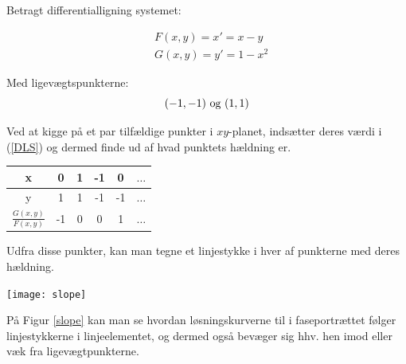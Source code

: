 \begin{Example}
\hfill \break
\textnormal{Betragt differentialligning systemet:} 

\begin{equation}\label{DLS}
    \begin{aligned}
    &F(x,y)= x'=x-y\\ 
    &G(x,y)=y'=1-x^2
    \end{aligned}
\end{equation}

\textnormal{Med ligevægtspunkterne:} $$(-1,-1) \ \textnormal{og} \ (1,1)$$
\textnormal{}

\textnormal{Ved at kigge på et par tilfældige punkter i $xy$-planet, indsætter deres værdi i (\ref{DLS}) og dermed finde ud af hvad punktets hældning er.} 

\begin{center}
  \begin{tabular}{ | c || c | c | c | c | c |}
    \hline
    x & 0 & 1 & -1 & 0 & $\hdots$ \\ \hline 
    y & 1 & 1 & -1 & -1 & $\hdots$\\ \hline \hline
    $\frac{G(x,y)}{F(x,y)}$ & -1 & 0 & 0 & 1 & $\hdots$\\ \hline
  \end{tabular}
\end{center}

\textnormal{Udfra disse punkter, kan man tegne et linjestykke i hver af punkterne med deres hældning.}

\begin{center}
\texttt{[image: slope]}
\end{center}
 \label{slope}
\hfill \break

\textnormal{På Figur \ref{slope} kan man se hvordan løsningskurverne til i faseportrættet følger linjestykkerne i linjeelementet, og dermed også bevæger sig hhv. hen  imod eller væk fra ligevægtpunkterne.}

\end{Example}

